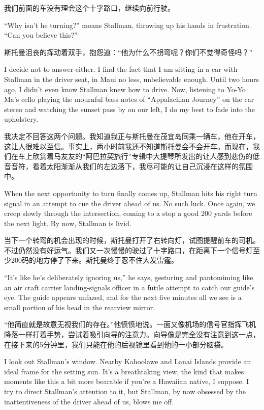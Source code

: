 \ifdefined\chs
我们前面的车没有理会这个十字路口，继续向前行驶。
\fi

\ifdefined\eng
``Why isn't he turning?'' moans Stallman, throwing up his hands in frustration. ``Can you believe this?''
\fi

\ifdefined\chs
斯托曼沮丧的挥动着双手，抱怨道：``他为什么不拐弯呢？你们不觉得奇怪吗？''
\fi

\ifdefined\eng
I decide not to answer either. I find the fact that I am sitting in a car with Stallman in the driver seat, in Maui no less, unbelievable enough. Until two hours ago, I didn't even know Stallman knew how to drive. Now, listening to Yo-Yo Ma's cello playing the mournful bass notes of ``Appalachian Journey'' on the car stereo and watching the sunset pass by on our left, I do my best to fade into the upholstery.
\fi

\ifdefined\chs
我决定不回答这两个问题。我知道我正与斯托曼在茂宜岛同乘一辆车，他在开车，这让人很难以至信。事实上，两小时前我还不知道斯托曼会不会开车。而现在，我们在车上欣赏着马友友的``阿巴拉契旅行''专辑中大提琴所发出的让人感到悲伤的低音音符，看着太阳渐渐从我们的左边落下，我尽可能的让自己沉浸在这样的氛围中。
\fi

\ifdefined\eng
When the next opportunity to turn finally comes up, Stallman hits his right turn signal in an attempt to cue the driver ahead of us. No such luck. Once again, we creep slowly through the intersection, coming to a stop a good 200 yards before the next light. By now, Stallman is livid.
\fi

\ifdefined\chs
当下一个转弯的机会出现的时候，斯托曼打开了右转向灯，试图提醒前车的司机。不过仍然没有好运气。我们又一次慢慢的驶过了十字路口，在距离下一个信号灯至少200码的地方停了下来。斯托曼终于忍不住大发雷霆。
\fi

\ifdefined\eng
``It's like he's deliberately ignoring us,'' he says, gesturing and pantomiming like an air craft carrier landing-signals officer in a futile attempt to catch our guide's eye. The guide appears unfazed, and for the next five minutes all we see is a small portion of his head in the rearview mirror.
\fi

\ifdefined\chs
``他简直就是故意无视我们的存在。''他愤愤地说。一面又像机场的信号官指挥飞机降落一样打着手势，尝试着吸引向导的注意力。向导像是完全没有注意到这一点，在接下来的5分钟里，我们只能在他的后视镜里看到他的一小部分脑袋。
\fi

\ifdefined\eng
I look out Stallman's window. Nearby Kahoolawe and Lanai Islands provide an ideal frame for the setting sun. It's a breathtaking view, the kind that makes moments like this a bit more bearable if you're a Hawaiian native, I suppose. I try to direct Stallman's attention to it, but Stallman, by now obsessed by the inattentiveness of the driver ahead of us, blows me off.
\fi

